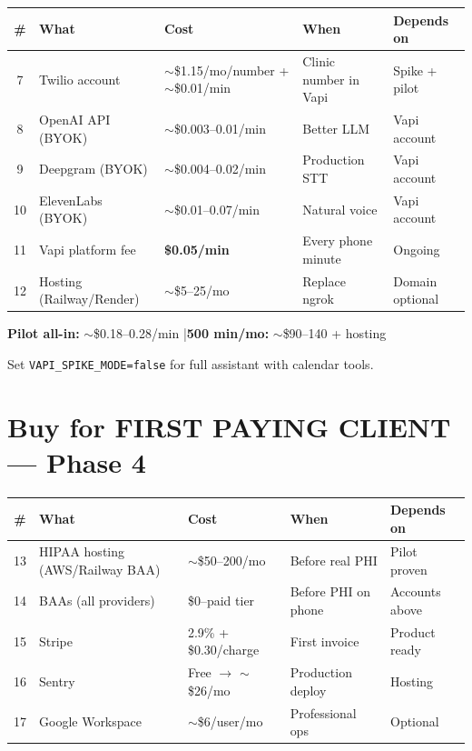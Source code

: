 \documentclass[11pt,a4paper]{article}
\begin{document}
\begin{center}
\scriptsize
\begin{tabular}{@{}cllll@{}}
\toprule
\textbf{\#} & \textbf{What} & \textbf{Cost} & \textbf{When} & \textbf{Depends on} \\
\midrule
7 & Twilio account & $\sim$\$1.15/mo/number + $\sim$\$0.01/min & Clinic number in Vapi & Spike + pilot \\
8 & OpenAI API (BYOK) & $\sim$\$0.003--0.01/min & Better LLM & Vapi account \\
9 & Deepgram (BYOK) & $\sim$\$0.004--0.02/min & Production STT & Vapi account \\
10 & ElevenLabs (BYOK) & $\sim$\$0.01--0.07/min & Natural voice & Vapi account \\
11 & Vapi platform fee & \textbf{\$0.05/min} & Every phone minute & Ongoing \\
12 & Hosting (Railway/Render) & $\sim$\$5--25/mo & Replace ngrok & Domain optional \\
\bottomrule
\end{tabular}
\end{center}

\textbf{Pilot all-in:} $\sim$\$0.18--0.28/min \quad|\quad \textbf{500 min/mo:} $\sim$\$90--140 + hosting

Set \texttt{VAPI\_SPIKE\_MODE=false} for full assistant with calendar tools.

\section{Buy for FIRST PAYING CLIENT --- Phase 4}

\begin{center}
\small
\begin{tabular}{@{}cllll@{}}
\toprule
\textbf{\#} & \textbf{What} & \textbf{Cost} & \textbf{When} & \textbf{Depends on} \\
\midrule
13 & HIPAA hosting (AWS/Railway BAA) & $\sim$\$50--200/mo & Before real PHI & Pilot proven \\
14 & BAAs (all providers) & \$0--paid tier & Before PHI on phone & Accounts above \\
15 & Stripe & 2.9\% + \$0.30/charge & First invoice & Product ready \\
16 & Sentry & Free $\rightarrow$ $\sim$\$26/mo & Production deploy & Hosting \\
17 & Google Workspace & $\sim$\$6/user/mo & Professional ops & Optional \\
\bottomrule
\end{tabular}
\end{center}
\end{document}
